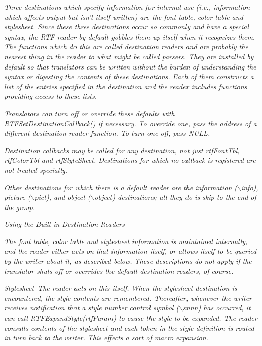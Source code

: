 \documentclass{article}
\begin{document}
\noindent
{\em Three destinations which specify information for internal use (i.e., 
information which affects output but isn't itself written) are the font table, 
color table and stylesheet. Since these three destinations occur so commonly 
and have a special syntax, the RTF reader by default gobbles them up itself 
when it recognizes them. The functions which do this are called destination 
readers and are probably the nearest thing in the reader to what might be 
called parsers. They are installed by default so that translators can be 
written without the burden of understanding the syntax or digesting the contents 
of these destinations. Each of them constructs a list of the entries specified 
in the destination and the reader includes functions providing access to 
these lists.



\noindent
{\em Translators can turn off or override these defaults with RTFSetDestinationCallback() 
if necessary. To override one, pass the address of a different destination 
reader function. To turn one off, pass NULL.



\noindent
{\em Destination callbacks may be called for any destination, not just rtfFontTbl, 
rtfColorTbl and rtfStyleSheet. Destinations for which no callback is registered 
are not treated specially.



\noindent
{\em Other destinations for which there is a default reader are the information 
($\backslash $info), picture ($\backslash $pict), and object ($\backslash $object) 
destinations; all they do is skip to the end of the group.



\noindent
{\bf {\em Using the Built-in Destination Readers





\noindent
{\bf {\em The font table, color table and stylesheet information is maintained 
internally, and the reader either acts on that information itself, or allows 
itself to be queried by the writer about it, as described below. These descriptions 
do not apply if the translator shuts off or overrides the default destination 
readers, of course.



\noindent
{\bf {\em Stylesheet--The reader acts on this itself. When the stylesheet 
destination is encountered, the style contents are remembered. Thereafter, 
whenever the writer receives notification that a style number control symbol 
($\backslash $snnn) has occurred, it can call RTFExpandStyle(rtfParam) to cause 
the style to be expanded. The reader consults contents of the stylesheet 
and each token in the style definition is routed in turn back to the writer. 
This effects a sort of macro expansion.



}}}}}}}}}}
\end{document}
